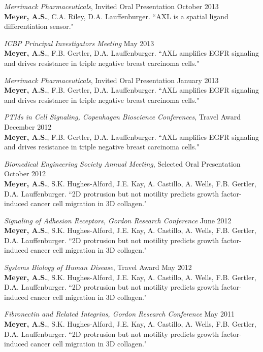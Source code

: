 \documentclass[11pt]{res}
\begin{document}
\begin{resume}
{\sl Merrimack Pharmaceuticals}, Invited Oral Presentation \hfill October 2013 \\
{\bf Meyer, A.S.}, C.A. Riley, D.A. Lauffenburger. ``AXL is a spatial ligand differentiation sensor."

{\sl ICBP Principal Investigators Meeting} \hfill May 2013 \\
{\bf Meyer, A.S.}, F.B. Gertler, D.A. Lauffenburger. ``AXL amplifies EGFR signaling and drives resistance in triple negative breast carcinoma cells."

{\sl Merrimack Pharmaceuticals}, Invited Oral Presentation \hfill January 2013 \\
{\bf Meyer, A.S.}, F.B. Gertler, D.A. Lauffenburger. ``AXL amplifies EGFR signaling and drives resistance in triple negative breast carcinoma cells."

{\sl PTMs in Cell Signaling, Copenhagen Bioscience Conferences}, Travel Award \hfill December 2012 \\
{\bf Meyer, A.S.}, F.B. Gertler, D.A. Lauffenburger. ``AXL amplifies EGFR signaling and drives resistance in triple negative breast carcinoma cells."

{\sl Biomedical Engineering Society Annual Meeting}, Selected Oral Presentation \hfill October 2012 \\
{\bf Meyer, A.S.}, S.K. Hughes-Alford, J.E. Kay, A. Castillo, A. Wells, F.B. Gertler, D.A. Lauffenburger. ``2D protrusion but not motility predicts growth factor-induced cancer cell migration in 3D collagen."

{\sl Signaling of Adhesion Receptors, Gordon Research Conference} \hfill June 2012 \\
{\bf Meyer, A.S.}, S.K. Hughes-Alford, J.E. Kay, A. Castillo, A. Wells, F.B. Gertler, D.A. Lauffenburger. ``2D protrusion but not motility predicts growth factor-induced cancer cell migration in 3D collagen."

{\sl Systems Biology of Human Disease}, Travel Award \hfill May 2012 \\
{\bf Meyer, A.S.}, S.K. Hughes-Alford, J.E. Kay, A. Castillo, A. Wells, F.B. Gertler, D.A. Lauffenburger. ``2D protrusion but not motility predicts growth factor-induced cancer cell migration in 3D collagen."

{\sl Fibronectin and Related Integrins, Gordon Research Conference} \hfill May 2011 \\
{\bf Meyer, A.S.}, S.K. Hughes-Alford, J.E. Kay, A. Castillo, A. Wells, F.B. Gertler, D.A. Lauffenburger. ``2D protrusion but not motility predicts growth factor-induced cancer cell migration in 3D collagen."


\end{resume}
\end{document}

